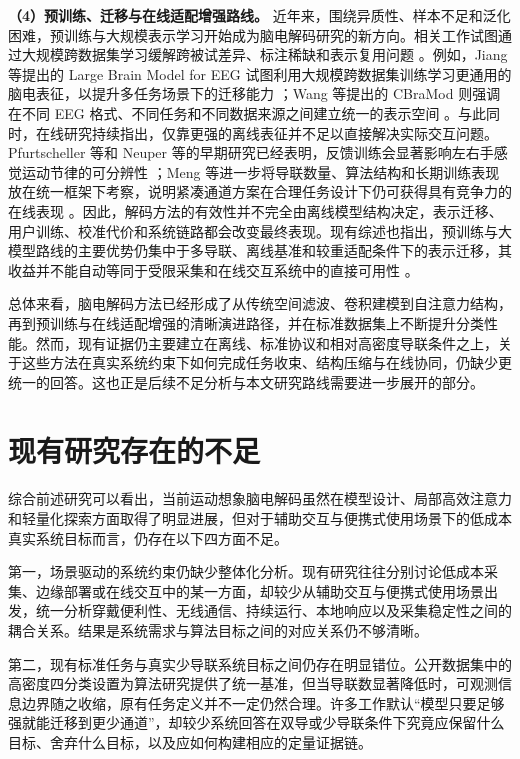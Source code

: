 \textbf{（4）预训练、迁移与在线适配增强路线。} 近年来，围绕异质性、样本不足和泛化困难，预训练与大规模表示学习开始成为脑电解码研究的新方向。相关工作试图通过大规模跨数据集学习缓解跨被试差异、标注稀缺和表示复用问题 \cite{Jia24, Wan24b}。例如，Jiang 等提出的 Large Brain Model for EEG 试图利用大规模跨数据集训练学习更通用的脑电表征，以提升多任务场景下的迁移能力 \cite{Jia24}；Wang 等提出的 CBraMod 则强调在不同 EEG 格式、不同任务和不同数据来源之间建立统一的表示空间 \cite{Wan24b}。与此同时，在线研究持续指出，仅靠更强的离线表征并不足以直接解决实际交互问题。Pfurtscheller 等和 Neuper 等的早期研究已经表明，反馈训练会显著影响左右手感觉运动节律的可分辨性 \cite{Pfu97, Neu99}；Meng 等进一步将导联数量、算法结构和长期训练表现放在统一框架下考察，说明紧凑通道方案在合理任务设计下仍可获得具有竞争力的在线表现 \cite{Men18}。因此，解码方法的有效性并不完全由离线模型结构决定，表示迁移、用户训练、校准代价和系统链路都会改变最终表现。现有综述也指出，预训练与大模型路线的主要优势仍集中于多导联、离线基准和较重适配条件下的表示迁移，其收益并不能自动等同于受限采集和在线交互系统中的直接可用性 \cite{Liu26b}。

总体来看，脑电解码方法已经形成了从传统空间滤波、卷积建模到自注意力结构，再到预训练与在线适配增强的清晰演进路径，并在标准数据集上不断提升分类性能。然而，现有证据仍主要建立在离线、标准协议和相对高密度导联条件之上，关于这些方法在真实系统约束下如何完成任务收束、结构压缩与在线协同，仍缺少更统一的回答。这也正是后续不足分析与本文研究路线需要进一步展开的部分。

\section{现有研究存在的不足}

综合前述研究可以看出，当前运动想象脑电解码虽然在模型设计、局部高效注意力和轻量化探索方面取得了明显进展，但对于辅助交互与便携式使用场景下的低成本真实系统目标而言，仍存在以下四方面不足。

第一，场景驱动的系统约束仍缺少整体化分析。现有研究往往分别讨论低成本采集、边缘部署或在线交互中的某一方面，却较少从辅助交互与便携式使用场景出发，统一分析穿戴便利性、无线通信、持续运行、本地响应以及采集稳定性之间的耦合关系。结果是系统需求与算法目标之间的对应关系仍不够清晰。

第二，现有标准任务与真实少导联系统目标之间仍存在明显错位。公开数据集中的高密度四分类设置为算法研究提供了统一基准，但当导联数显著降低时，可观测信息边界随之收缩，原有任务定义并不一定仍然合理。许多工作默认“模型只要足够强就能迁移到更少通道”，却较少系统回答在双导或少导联条件下究竟应保留什么目标、舍弃什么目标，以及应如何构建相应的定量证据链。

